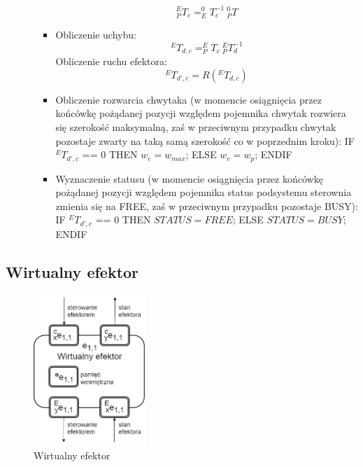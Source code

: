 \documentclass{article}
\begin{document}
\begin{itemize}
\begin{itemize}
\begin{itemize}
\[^E_PT_c = ^0_ET_c^{-1}~^0_PT\]
\item Obliczenie uchybu: 
\[^ET_{d,c}=^E_PT_c~^E_PT_d^{-1}\]
Obliczenie ruchu efektora:
\[^ET_{d',c}=R(^ET_{d,c})\]
\item Obliczenie rozwarcia chwytaka (w momencie osiągnięcia przez końcówkę pożądanej pozycji względem pojemnika chwytak rozwiera się szeroko\'sć maksymalną, za\'s w przeciwnym przypadku chwytak pozostaje zwarty na taką samą szeroko\'sć co w poprzednim kroku):
\newline
IF $^ET_{d',c}$ == 0 THEN \newline
$w_e = w_{max}$; \newline
ELSE \newline
$w_e = w_p$; \newline
ENDIF
\item Wyznaczenie statusu (w momencie osiągnięcia przez końcówkę pożądanej pozycji względem pojemnika status podsystemu sterownia zmienia się na FREE, za\'s w przeciwnym przypadku pozostaje BUSY):
\newline
IF $^ET_{d',c}$ == 0 THEN \newline
$STATUS = FREE$; \newline
ELSE \newline
$STATUS= BUSY$; \newline
ENDIF
\end{itemize}
\end{itemize}

\end{itemize}



\subsection{Wirtualny efektor}

\begin{figure}[H]
	\centering
	\includegraphics[width=0.38\textwidth]{wirtualny_efektor.png}
	\caption{Wirtualny efektor}
	\label{fig::wirtualny_efektor}
\end{figure}
\end{document}
